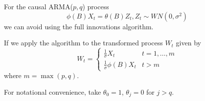 For the causal \textsc{ARMA}($p, q$) process
\begin{equation}
  \label{eq:35}
  \phi(B) X_{t} = \theta(B) Z_{t}, Z_{t} \sim WN(0, \sigma^{2})
\end{equation} we can avoid using the full innovations algorithm.

If we apply the algorithm to the transformed process $W_{t}$ given by
\begin{equation}
  \label{eq:36}
  W_{t} =
  \begin{cases}
    \frac{1}{\sigma} X_{t} & t = 1, \dots, m \\
    \frac{1}{\sigma} \phi(B) X_{t} & t > m
  \end{cases}
\end{equation} where $m = \max(p, q)$.

For notational convenience, take $\theta_{0} = 1$, $\theta_{j} = 0 $
for $j > q$.

